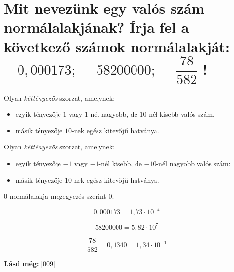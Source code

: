 
\section{Mit nevezünk egy valós szám normálalakjának? Írja fel a következő 
számok normálalakját:
\texorpdfstring{$\quad0,000173;$}{ 0,000173;}
\texorpdfstring{$\quad 58200000;$}{ 58200000;}
\texorpdfstring{$\quad\dfrac{78}{582}$}{ 78/582}
!}
\label{015}

\begin{defin}
Olyan \emph{kéttényezős} szorzat, amelynek:
\begin{itemize}
  \item egyik tényezője $1$ vagy $1$-nél nagyobb, de $10$-nél kisebb valós 
    szám,
  \item másik tényezője $10$-nek egész kitevőjű hatványa.
\end{itemize}
\end{defin}

\begin{defin}
Olyan \emph{kéttényezős} szorzat, amelynek:
\begin{itemize}
  \item egyik tényezője $-1$ vagy $-1$-nél kisebb, de $-10$-nél nagyobb valós
    szám;
  \item másik tényezője $10$-nek egész kitevőjű hatványa.
\end{itemize}
\end{defin}

\begin{note}
$0$ normálalakja megegyezés szerint $0$.
\end{note}

\[
  0,000173 = 1,73 \cdot 10^{-4}
\]

\[
  58200000 = 5,82 \cdot 10^7
\]

\[
  \frac{78}{582} = 0,1340 = 1,34 \cdot 10^{-1}
\]

\textbf{Lásd még:} \ref{009}
